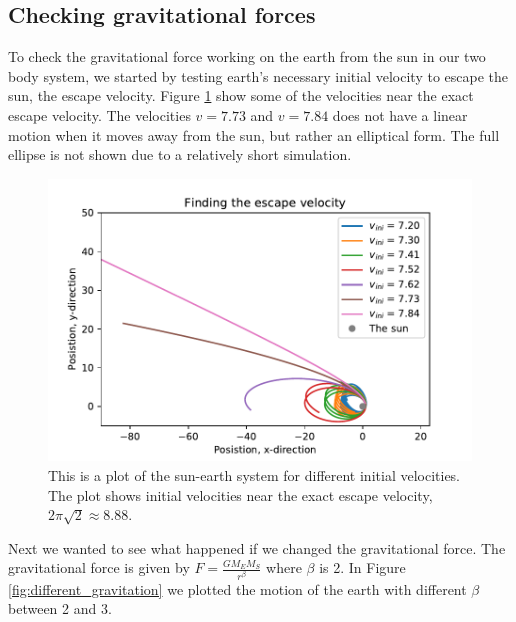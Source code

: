 \subsection{Checking gravitational forces}

To check the gravitational force working on the earth from the sun in our two body system, we started by testing earth's necessary initial velocity to escape the sun, the escape velocity.  Figure \ref{fig:escape_velocity_near_exact} show some of the velocities near the exact escape velocity. The velocities $ v = 7.73 $ and $ v = 7.84 $ does not have a linear motion when it moves away from the sun, but rather an elliptical form. The full ellipse is not shown due to a relatively short simulation. 


\begin{figure}[H]
\includegraphics[width=0.9\linewidth]{../results/plots/escape_velocity.pdf}\caption{This is a plot of the sun-earth system for different initial velocities. The plot shows initial velocities near the exact escape velocity, $2\pi\sqrt{2} \approx 8.88 $. }\label{fig:escape_velocity_near_exact}
\end{figure}

Next we wanted to see what happened if we changed the gravitational force. The gravitational force is given by $ F = \frac{GM_EM_S}{r^\beta}$ where $\beta$ is 2. In Figure \ref{fig:different_gravitation} we plotted the motion of the earth with different $\beta$ between 2 and 3.

